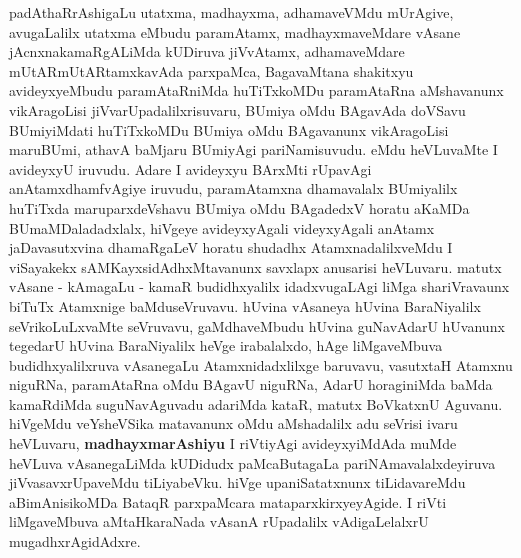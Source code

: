 \begin{artha}
padAthaRrAshigaLu utatxma, madhayxma, adhamaveVMdu mUrAgive,
avugaLalilx utatxma eMbudu paramAtamx, madhayxmaveMdare vAsane
jAcnxnakamaRgALiMda kUDiruva jiVvAtamx, adhamaveMdare
mUtARmUtARtamxkavAda parxpaMca, BagavaMtana shakitxyu avideyxyeMbudu
paramAtaRniMda huTiTxkoMDu paramAtaRna aMshavanunx vikAragoLisi
jiVvarUpadalilxrisuvaru, BUmiya oMdu BAgavAda doVSavu BUmiyiMdati
huTiTxkoMDu BUmiya oMdu BAgavanunx vikAragoLisi maruBUmi, athavA
baMjaru BUmiyAgi pariNamisuvudu. eMdu heVLuvaMte I avideyxyU
iruvudu. Adare I avideyxyu BArxMti rUpavAgi anAtamxdhamfvAgiye
iruvudu, paramAtamxna dhamavalalx BUmiyalilx huTiTxda maruparxdeVshavu
BUmiya oMdu BAgadedxV horatu aKaMDa BUmaMDaladadxlalx, hiVgeye
avideyxyAgali videyxyAgali anAtamx jaDavasutxvina dhamaRgaLeV horatu
shudadhx AtamxnadalilxveMdu I viSayakekx sAMKayxsidAdhxMtavanunx
savxlapx anusarisi heVLuvaru. matutx vAsane - kAmagaLu - kamaR
budidhxyalilx idadxvugaLAgi liMga shariVravaunx biTuTx Atamxnige
baMduseVruvavu. hUvina vAsaneya hUvina BaraNiyalilx seVrikoLuLxvaMte
seVruvavu, gaMdhaveMbudu hUvina guNavAdarU hUvanunx tegedarU hUvina
BaraNiyalilx heVge irabalalxdo, hAge liMgaveMbuva budidhxyalilxruva
vAsanegaLu Atamxnidadxlilxge baruvavu, vasutxtaH Atamxnu niguRNa,
paramAtaRna oMdu BAgavU niguRNa, AdarU horaginiMda baMda kamaRdiMda
suguNavAguvadu adariMda kataR, matutx BoVkatxnU Aguvanu. hiVgeMdu
veYsheVSika matavanunx oMdu aMshadalilx adu seVrisi ivaru heVLuvaru,
\textbf{madhayxmarAshiyu} I riVtiyAgi avideyxyiMdAda muMde heVLuva
vAsanegaLiMda kUDidudx paMcaButagaLa pariNAmavalalxdeyiruva
jiVvasavxrUpaveMdu tiLiyabeVku. hiVge upaniSatatxnunx tiLidavareMdu
aBimAnisikoMDa BataqR parxpaMcara mataparxkirxyeyAgide. I riVti
liMgaveMbuva aMtaHkaraNada vAsanA rUpadalilx vAdigaLelalxrU mugadhxrAgidAdxre.
\end{artha}

\begin{center}


\end{center}

